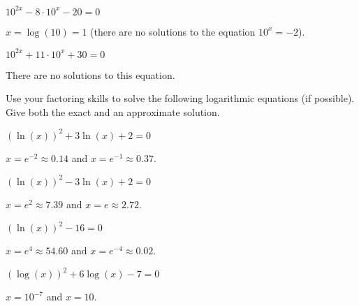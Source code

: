 \begin{exercises}
\begin{problem}[Factoring]
\begin{multicols}{4}
\begin{subproblem}
		$10^{2x}-8\cdot 10^x-20=0$
		\begin{shortsolution}
			$x=\log(10)=1$ (there are no solutions to the equation $10^x=-2$).
		\end{shortsolution}
	\end{subproblem}
	\begin{subproblem}
		$10^{2x}+11\cdot 10^x+30=0$
		\begin{shortsolution}
			There are no solutions to this equation.
		\end{shortsolution}
	\end{subproblem}
\end{multicols}
\end{problem}

\begin{problem}
Use your factoring skills to solve the following 
logarithmic equations (if possible). Give both the exact and an approximate solution.
\begin{multicols}{3}
	\begin{subproblem}
		$(\ln(x))^2+3\ln(x)+2=0$ 
		\begin{shortsolution}
			$x=e^{-2}\approx 0.14$ and $x=e^{-1}\approx 0.37$.
		\end{shortsolution}
	\end{subproblem}
	\begin{subproblem}
		$(\ln(x))^2-3\ln(x)+2=0$ 
		\begin{shortsolution}
			$x=e^2\approx 7.39$ and $x=e\approx 2.72$.
		\end{shortsolution}
	\end{subproblem}
	\begin{subproblem}
		$(\ln(x))^2-16=0$
		\begin{shortsolution}
			$x=e^4\approx 54.60$ and $x=e^{-4}\approx 0.02$. 
		\end{shortsolution}
	\end{subproblem}
\end{multicols}
\begin{multicols}{3}
	\begin{subproblem}
		$(\log(x))^2+6\log(x)-7=0$ 
		\begin{shortsolution}
			$x=10^{-7}$ and $x=10$.
		\end{shortsolution}

\end{subproblem}
\end{multicols}
\end{problem}
\end{exercises}
